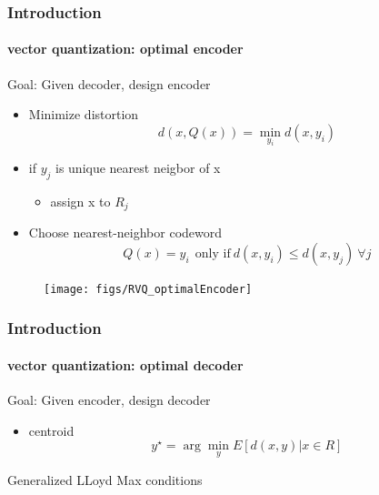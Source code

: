 \begin{frame}
\frametitle{Introduction}
\framesubtitle{vector quantization: optimal encoder}\logoCSIPCPL\mypagenum
	\vspace{0.2 in}
	{\color{red}Goal}: Given decoder, design encoder 

	\begin{itemize}
		\item Minimize distortion 
			\begin{equation*}	
				d(x,Q(x)) = \min_{y_i} d(x,y_i)
			\end{equation*}
		\item if $y_j$ is unique nearest neigbor of x
			\begin{itemize}
				\item assign x to $R_j$
			\end{itemize}
		\item Choose nearest-neighbor codeword
			\begin{equation*}
				Q(x)=y_i \ \ \text{only if} \ d(x,y_i) \leq d(x,y_j)  \ \forall j
			\end{equation*}
	\end{itemize}

	\begin{figure}
		\texttt{[image: figs/RVQ\_optimalEncoder]}
	\end{figure}
\end{frame}



\begin{frame}
\frametitle{Introduction}
\framesubtitle{vector quantization: optimal decoder}
\logoCSIPCPL\mypagenum
	\vspace{0.2 in}
	{\color{red}Goal}: Given encoder, design decoder 
	\begin{itemize}
		\item centroid
			\begin{equation*}
				y^{\star} = \arg \min_y E[d(x,y) | x \in R]
			\end{equation*}
	\end{itemize}

	\begin{block}{Generalized LLoyd Max conditions}
	\end{block}
\end{frame}



